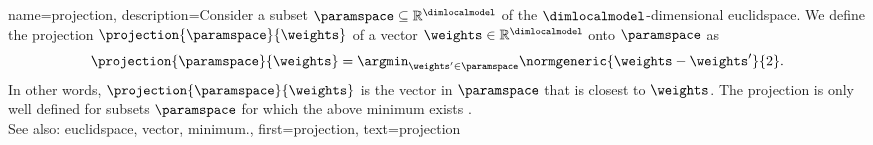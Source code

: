  {name={projection}, 
       description={Consider a subset $\paramspace \subseteq \mathbb{R}^{\dimlocalmodel}$ of 
	   the $\dimlocalmodel$-dimensional \gls{euclidspace}. We define the projection $\projection{\paramspace}{\weights}$
	   of a \gls{vector} $\weights \in \mathbb{R}^{\dimlocalmodel}$ onto $\paramspace$ as
	   \begin{equation} 
   	   	\nonumber
		\label{equ_def_proj_generic_dict}
  	    	\projection{\paramspace}{\weights} = \argmin_{\weights' \in \paramspace} \normgeneric{\weights - \weights'}{2}. 
        	    \end{equation}
	    In other words, $\projection{\paramspace}{\weights}$ is the \gls{vector} in $\paramspace$ 
	    that is closest to $\weights$. The projection is only well defined for subsets $\paramspace$ 
	    for which the above \gls{minimum} exists \cite{BoydConvexBook}.
		 			\\ 
	    See also: \gls{euclidspace}, \gls{vector}, \gls{minimum}.},
	first={projection},
	text={projection}
}


